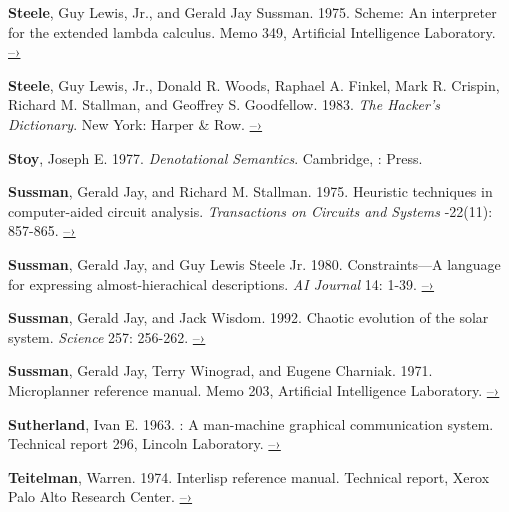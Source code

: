  \label{Steele and Sussman 1975}
\textbf{Steele}, Guy Lewis, Jr., and Gerald Jay Sussman.  1975.  Scheme: An interpreter
for the extended lambda calculus.  Memo 349,  Artificial
Intelligence Laboratory.
\href{http://dspace.mit.edu/handle/1721.1/5794}{–›}

 \label{Steele et al. 1983}
\textbf{Steele}, Guy Lewis, Jr., Donald R. Woods, Raphael A. Finkel, Mark R.  Crispin,
Richard M. Stallman, and Geoffrey S. Goodfellow.  1983.  \textit{The Hacker's
Dictionary}. New York: Harper \& Row.
\href{http://www.dourish.com/goodies/jargon.html}{–›}

 \label{Stoy 1977}
\textbf{Stoy}, Joseph E.  1977.  \textit{Denotational Semantics}. Cambridge, :
 Press.

 \label{Sussman and Stallman 1975}
\textbf{Sussman}, Gerald Jay, and Richard M. Stallman.  1975.  Heuristic techniques in
computer-aided circuit analysis.  \textit{ Transactions on Circuits
and Systems} -22(11): 857-865.
\href{http://dspace.mit.edu/handle/1721.1/5803}{–›}

 \label{Sussman and Steele 1980}
\textbf{Sussman}, Gerald Jay, and Guy Lewis Steele Jr.  1980.  Constraints---A language
for expressing almost-hierachical descriptions.  \textit{AI Journal} 14: 1-39.
\href{http://dspace.mit.edu/handle/1721.1/6312}{–›}

 \label{Sussman and Wisdom 1992}
\textbf{Sussman}, Gerald Jay, and Jack Wisdom.  1992. Chaotic evolution of the solar
system.  \textit{Science} 257: 256-262.
\href{http://groups.csail.mit.edu/mac/users/wisdom/ss-chaos.pdf}{–›}

 \label{Sussman et al. (1971)}
\textbf{Sussman}, Gerald Jay, Terry Winograd, and Eugene Charniak.  1971.  Microplanner
reference manual.  Memo 203,  Artificial Intelligence Laboratory.
\href{http://dspace.mit.edu/handle/1721.1/6184}{–›}

 \label{Sutherland (1963)}
\textbf{Sutherland}, Ivan E.  1963.  : A man-machine graphical
communication system.  Technical report 296,  Lincoln Laboratory.
\href{https://www.cl.cam.ac.uk/techreports/UCAM-CL-TR-574.pdf}{–›}

 \label{Teitelman 1974}
\textbf{Teitelman}, Warren.  1974.  Interlisp reference manual.  Technical report, Xerox
Palo Alto Research Center.
\href{http://www.softwarepreservation.org/projects/LISP/interlisp/Interlisp-Oct_1974.pdf/view}{–›}

